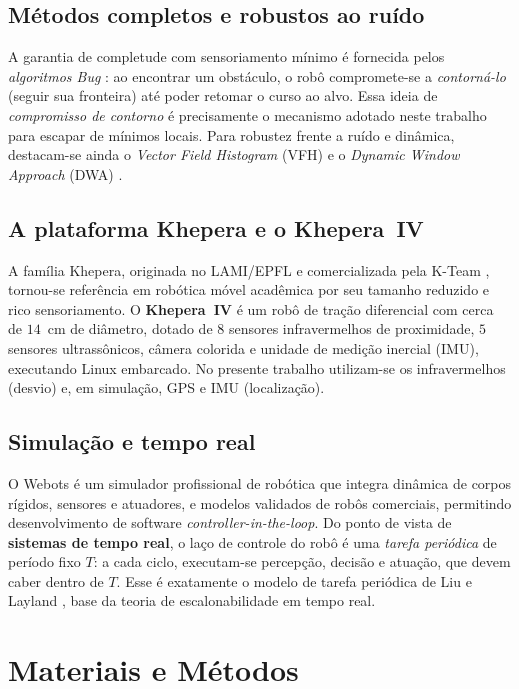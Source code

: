 \documentclass[11pt,a4paper]{article}
\begin{document}
\subsection{Métodos completos e robustos ao ruído}
A garantia de completude com sensoriamento mínimo é fornecida pelos \emph{algoritmos Bug} \cite{lumelsky1987}: ao encontrar um obstáculo, o robô compromete-se a \emph{contorná-lo} (seguir sua fronteira) até poder retomar o curso ao alvo. Essa ideia de \emph{compromisso de contorno} é precisamente o mecanismo adotado neste trabalho para escapar de mínimos locais. Para robustez frente a ruído e dinâmica, destacam-se ainda o \emph{Vector Field Histogram} (VFH) \cite{borenstein1991vfh} e o \emph{Dynamic Window Approach} (DWA) \cite{fox1997dwa}.

\subsection{A plataforma Khepera e o Khepera~IV}
A família Khepera, originada no LAMI/EPFL e comercializada pela K-Team \cite{mondada1993khepera}, tornou-se referência em robótica móvel acadêmica por seu tamanho reduzido e rico sensoriamento. O \textbf{Khepera~IV} \cite{soares2016khepera} é um robô de tração diferencial com cerca de $14$~cm de diâmetro, dotado de $8$ sensores infravermelhos de proximidade, $5$ sensores ultrassônicos, câmera colorida e unidade de medição inercial (IMU), executando Linux embarcado. No presente trabalho utilizam-se os infravermelhos (desvio) e, em simulação, GPS e IMU (localização).

\subsection{Simulação e tempo real}
O Webots \cite{michel2004webots} é um simulador profissional de robótica que integra dinâmica de corpos rígidos, sensores e atuadores, e modelos validados de robôs comerciais, permitindo desenvolvimento de software \emph{controller-in-the-loop}. Do ponto de vista de \textbf{sistemas de tempo real}, o laço de controle do robô é uma \emph{tarefa periódica} de período fixo $T$: a cada ciclo, executam-se percepção, decisão e atuação, que devem caber dentro de $T$. Esse é exatamente o modelo de tarefa periódica de Liu e Layland \cite{liu1973}, base da teoria de escalonabilidade em tempo real.

\section{Materiais e Métodos}\label{sec:metodo}
\end{document}
